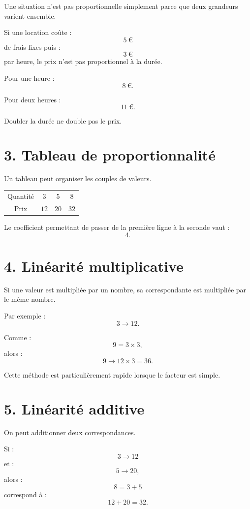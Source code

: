 Une situation n'est pas proportionnelle simplement parce que deux grandeurs varient ensemble.

Si une location coûte :
\[
5\ \text{€}
\]
de frais fixes puis :
\[
3\ \text{€}
\]
par heure, le prix n'est pas proportionnel à la durée.

Pour une heure :
\[
8\ \text{€}.
\]

Pour deux heures :
\[
11\ \text{€}.
\]

Doubler la durée ne double pas le prix.

\section{3. Tableau de proportionnalité}

Un tableau peut organiser les couples de valeurs.

\begin{tabular}{c|c|c|c}
Quantité & $3$ & $5$ & $8$ \\
Prix & $12$ & $20$ & $32$ \\
\end{tabular}

Le coefficient permettant de passer de la première ligne à la seconde vaut :
\[
4.
\]


\section{4. Linéarité multiplicative}

Si une valeur est multipliée par un nombre, sa correspondante est multipliée par le même nombre.

Par exemple :
\[
3\longrightarrow12.
\]

Comme :
\[
9=3\times3,
\]
alors :
\[
9\longrightarrow12\times3=36.
\]

Cette méthode est particulièrement rapide lorsque le facteur est simple.

\section{5. Linéarité additive}

On peut additionner deux correspondances.

Si :
\[
3\longrightarrow12
\]
et :
\[
5\longrightarrow20,
\]
alors :
\[
8=3+5
\]
correspond à :
\[
12+20=32.
\]

